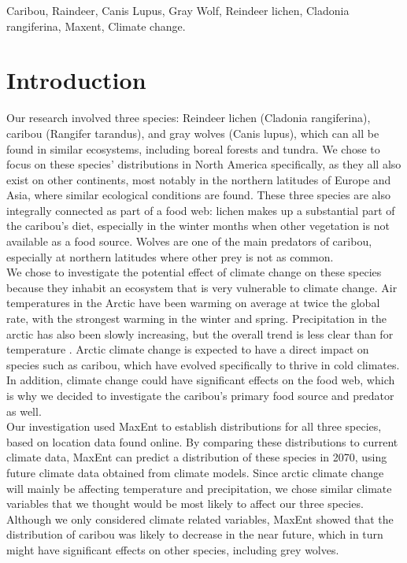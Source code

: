 \documentclass[twoside]{article}
\begin{document}
\begin{framed}
\begin{abstract}
\end{abstract}

\begin{keywords}

Caribou,
Raindeer,
Canis Lupus,
Gray Wolf,
Reindeer lichen,
Cladonia rangiferina,
Maxent,
Climate change.

\end{keywords}

\end{framed}

\section{Introduction}
\indent Our research involved three species: Reindeer lichen (Cladonia rangiferina),
caribou (Rangifer tarandus), and gray wolves (Canis lupus), which can all be
found in similar ecosystems, including boreal forests and tundra. We chose to
focus on these species’ distributions in North America specifically, as they
all also exist on other continents, most notably in the northern latitudes of
Europe and Asia, where similar ecological conditions are found. These three
species are also integrally connected as part of a food web: lichen makes up
a substantial part of the caribou’s diet, especially in the winter months when
other vegetation is not available as a food source. Wolves are one of the main
predators of caribou, especially at northern latitudes where other prey is not
as common. \\
\indent We chose to investigate the potential effect of climate change on these species
because they inhabit an ecosystem that is very vulnerable to climate change.
Air temperatures in the Arctic have been warming on average at twice the global
rate, with the strongest warming in the winter and spring. Precipitation in the
arctic has also been slowly increasing, but the overall trend is less clear
than for temperature \cite{ipcc4ar}. Arctic climate change is
expected to have a direct impact on species such as caribou, which have evolved
specifically to thrive in cold climates. In addition, climate change could have
significant effects on the food web, which is why we decided to investigate the
caribou’s primary food source and predator as well. \\
\indent Our investigation used MaxEnt to establish distributions for all three species,
based on location data found online. By comparing these distributions to current
climate data, MaxEnt can predict a distribution of these species in 2070, using
future climate data obtained from climate models. Since arctic climate change
will mainly be affecting temperature and precipitation, we chose similar
climate variables that we thought would be most likely to affect our three
species. Although we only considered climate related variables, MaxEnt showed
that the distribution of caribou was likely to decrease in the near future,
which in turn might have significant effects on other species, including
grey wolves.
\end{document}
